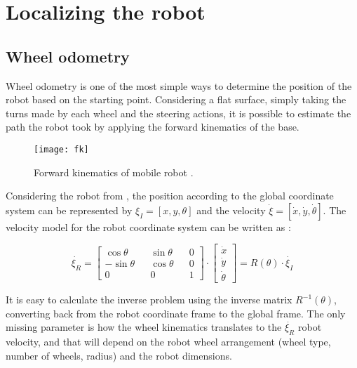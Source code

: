 \section{Localizing the robot} \label{sec:localizing}

\subsection{Wheel odometry}

Wheel odometry is one of the most simple ways to determine the position of the robot based on the starting point. Considering a flat surface, simply taking the turns made by each wheel and the steering actions, it is possible to estimate the path the robot took by applying the forward kinematics of the base.

\begin{figure}
    \centering
    \texttt{[image: fk]}
    \caption[Forward kinematics of mobile robot.]{Forward kinematics of mobile robot \cite{siegwart2011introduction}.}
    \label{fig:fk}
\end{figure}

Considering the robot from , the position according to the global coordinate system can be represented by $\xi_I = [x, y, \theta]$ and the velocity $\dot{\xi} = [\dot{x}, \dot{y}, \dot{\theta}]$. The velocity model for the robot coordinate system can be written as \cite{siegwart2011introduction}:

\begin{equation}
\dot{\xi_R} = 
\begin{bmatrix}
\cos \theta && \sin \theta && 0 \\
- \sin \theta  && \cos \theta && 0 \\
0 && 0 && 1
\end{bmatrix}
\cdot 
\begin{bmatrix}
\dot{x} \\
\dot{y} \\
\dot{\theta}
\end{bmatrix}
=
R(\theta) \cdot \dot{\xi_I}
\end{equation}

It is easy to calculate the inverse problem using the inverse matrix $R^{-1}(\theta)$, converting back from the robot coordinate frame to the global frame. The only missing parameter is how the wheel kinematics translates to the $\dot{\xi_R}$ robot velocity, and that will depend on the robot wheel arrangement (wheel type, number of wheels, radius) and the robot dimensions.

